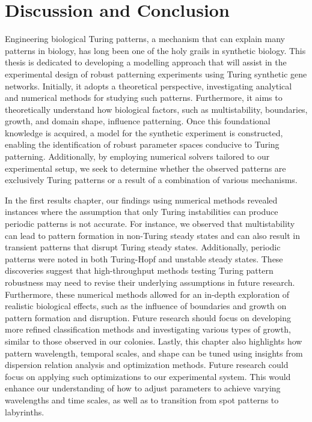 \chapter{Discussion and Conclusion}

Engineering biological Turing patterns, a mechanism that can explain many patterns in biology, has long been one of the holy grails in synthetic biology.
This thesis is dedicated to developing a modelling approach that will assist in the experimental design of robust patterning experiments using Turing synthetic gene networks.
Initially, it adopts a theoretical perspective, investigating analytical and numerical methods for studying such patterns.
Furthermore, it aims to theoretically understand how biological factors, such as multistability, boundaries, growth, and domain shape, influence patterning.
Once this foundational knowledge is acquired, a model for the synthetic experiment is constructed, enabling the identification of robust parameter spaces conducive to Turing patterning.
Additionally, by employing numerical solvers tailored to our experimental setup, we seek to determine whether the observed patterns are exclusively Turing patterns or a result of a combination of various mechanisms.

In the first results chapter, our findings using numerical methods revealed instances where the assumption that only Turing instabilities can produce periodic patterns is not accurate.
For instance, we observed that multistability can lead to pattern formation in non-Turing steady states and can also result in transient patterns that disrupt Turing steady states.
Additionally, periodic patterns were noted in both Turing-Hopf and unstable steady states.
These discoveries suggest that high-throughput methods testing Turing pattern robustness may need to revise their underlying assumptions in future research.
Furthermore, these numerical methods allowed for an in-depth exploration of realistic biological effects, such as the influence of boundaries and growth on pattern formation and disruption.
Future research should focus on developing more refined classification methods and investigating various types of growth, similar to those observed in our colonies.
Lastly, this chapter also highlights how pattern wavelength, temporal scales, and shape can be tuned using insights from dispersion relation analysis and optimization methods.
Future research could focus on applying such optimizations to our experimental system.
This would enhance our understanding of how to adjust parameters to achieve varying wavelengths and time scales, as well as to transition from spot patterns to labyrinths.

